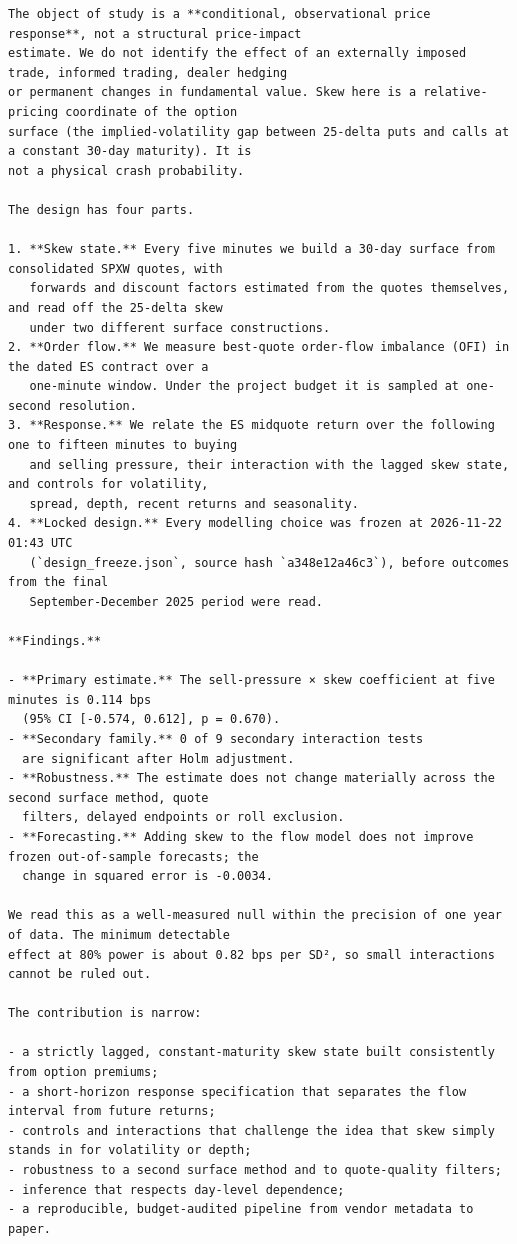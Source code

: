 \documentclass[11pt]{article}
\begin{document}
\begin{verbatim}
The object of study is a **conditional, observational price response**, not a structural price-impact
estimate. We do not identify the effect of an externally imposed trade, informed trading, dealer hedging
or permanent changes in fundamental value. Skew here is a relative-pricing coordinate of the option
surface (the implied-volatility gap between 25-delta puts and calls at a constant 30-day maturity). It is
not a physical crash probability.

The design has four parts.

1. **Skew state.** Every five minutes we build a 30-day surface from consolidated SPXW quotes, with
   forwards and discount factors estimated from the quotes themselves, and read off the 25-delta skew
   under two different surface constructions.
2. **Order flow.** We measure best-quote order-flow imbalance (OFI) in the dated ES contract over a
   one-minute window. Under the project budget it is sampled at one-second resolution.
3. **Response.** We relate the ES midquote return over the following one to fifteen minutes to buying
   and selling pressure, their interaction with the lagged skew state, and controls for volatility,
   spread, depth, recent returns and seasonality.
4. **Locked design.** Every modelling choice was frozen at 2026-11-22 01:43 UTC
   (`design_freeze.json`, source hash `a348e12a46c3`), before outcomes from the final
   September-December 2025 period were read.

**Findings.**

- **Primary estimate.** The sell-pressure × skew coefficient at five minutes is 0.114 bps
  (95% CI [-0.574, 0.612], p = 0.670).
- **Secondary family.** 0 of 9 secondary interaction tests
  are significant after Holm adjustment.
- **Robustness.** The estimate does not change materially across the second surface method, quote
  filters, delayed endpoints or roll exclusion.
- **Forecasting.** Adding skew to the flow model does not improve frozen out-of-sample forecasts; the
  change in squared error is -0.0034.

We read this as a well-measured null within the precision of one year of data. The minimum detectable
effect at 80% power is about 0.82 bps per SD², so small interactions cannot be ruled out.

The contribution is narrow:

- a strictly lagged, constant-maturity skew state built consistently from option premiums;
- a short-horizon response specification that separates the flow interval from future returns;
- controls and interactions that challenge the idea that skew simply stands in for volatility or depth;
- robustness to a second surface method and to quote-quality filters;
- inference that respects day-level dependence;
- a reproducible, budget-audited pipeline from vendor metadata to paper.


\end{verbatim}
\end{document}
